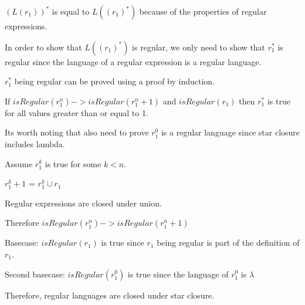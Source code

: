 $(L(r_1))^*$ is equal to $L((r_1)^*)$ because of the properties of regular expressions.

In order to show that $L((r_1)^*)$ is regular, we only need to show that $r_1^*$ is regular since the language of a regular expression is a regular language.

$r_1^*$ being regular can be proved using a proof by induction.

If $isRegular(r_1^n) -> isRegular(r_1^n+1)$ and $isRegular(r_1)$ then $r_1^*$ is true for all values greater than or equal to 1.

Its worth noting that also need to prove $r_1^0$ is a regular language since star closure includes lambda.

Assume $r_1^k$ is true for some $k < n$. 

$r_1^k + 1$ = $r_1^k \cup r_1$

Regular expressions are closed under union.

Therefore $isRegular(r_1^n) -> isRegular(r_1^n+1)$

Basecase: $isRegular(r_1)$ is true since $r_1$ being regular is part of the definition of $r_1$.

Second basecase: $isRegular(r_1^0)$ is true since the language of $r_1^0$ is ${\lambda}$

Therefore, regular languages are closed under star closure.

